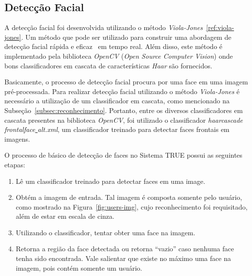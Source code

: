 	\subsection{Detecção Facial}

		A detecção facial foi desenvolvida utilizando o método \textit{Viola-Jones}~\ref{ref:viola-jones}. Um método que pode ser utilizado para construir uma abordagem de detecção facial rápida e eficaz~\cite{violajones} em tempo real. Além disso, este método é implementado pela biblioteca \textit{OpenCV} (\textit{Open Source Computer Vision}) onde bons classificadores em cascata de características \textit{Haar} são fornecidos.

		Basicamente, o processo de detecção facial procura por uma face em uma imagem pré-processada. Para realizar detecção facial utilizando o método \textit{Viola-Jones} é necessário a utilização de um classificador em cascata, como mencionado na Subseção~\ref{subsec:reconhecimento}. Portanto, entre os diversos classificadores em cascata presentes na biblioteca \textit{OpenCV}, foi utilizado o classificador \textit{haarcascade\underline{ }frontalface\underline{ }alt.xml}, um classificador treinado para detectar faces frontais em imagens.


		O processo de básico de detecção de faces no Sistema TRUE possui as seguintes etapas:

		\begin{enumerate}
			\item Lê um classificador treinado para detectar faces em uma image.
			\item Obtém a imagem de entrada. Tal imagem é composta somente pelo usuário, como mostrado na Figura~\ref{fig:users-img}, cujo reconhecimento foi requisitado, além de estar em escala de cinza.
			\item Utilizando o classificador, tentar obter uma face na imagem.
			\item Retorna a região da face detectada ou retorna ``vazio'' caso nenhuma face tenha sido encontrada. Vale salientar que existe no máximo uma face na imagem, pois contém somente um usuário.
		\end{enumerate}

